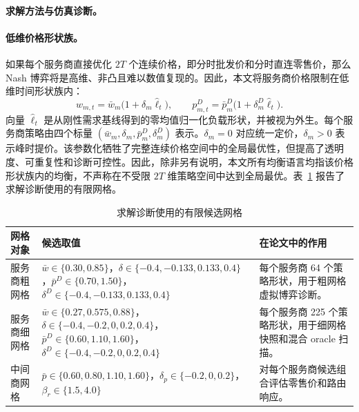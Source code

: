 \documentclass[UTF8,11pt,a4paper]{ctexart}
\begin{document}
\paragraph{求解方法与仿真诊断。}
\label{sec:solver}

\paragraph{低维价格形状族。}

如果每个服务商直接优化 $2T$ 个连续价格，即分时批发价和分时直连零售价，那么 Nash 博弈将是高维、非凸且难以数值复现的。因此，本文将服务商价格限制在低维时间形状族内：
\begin{equation}
  w_{m,t}=\bar w_m\big(1+\delta_m\widehat{\ell}_t\big),
  \qquad
  p^D_{m,t}=\bar p^D_m\big(1+\delta^D_m\widehat{\ell}_t\big).
  \label{eq:shape}
\end{equation}
向量 $\widehat{\ell}_t$ 是从刚性需求基线得到的零均值归一化负载形状，并被视为外生。每个服务商策略由四个标量 $(\bar w_m,\delta_m,\bar p^D_m,\delta^D_m)$ 表示。$\delta_m=0$ 对应统一定价，$\delta_m>0$ 表示峰时提价。该参数化牺牲了完整连续价格空间中的全局最优性，但提高了透明度、可重复性和诊断可控性。因此，除非另有说明，本文所有均衡语言均指该价格形状族内的均衡，不声称在不受限 $2T$ 维策略空间中达到全局最优。表~\ref{tab:solver_grids} 报告了求解诊断使用的有限网格。

\begin{table}[H]
\centering
\caption{求解诊断使用的有限候选网格}
\label{tab:solver_grids}
\small
\begin{tabular}{p{}p{}p{}}
\toprule
网格对象 & 候选取值 & 在论文中的作用 \\
\midrule
服务商粗网格 &
$\bar w\in\{0.30,0.85\}$，$\delta\in\{-0.4,-0.133,0.133,0.4\}$，$\bar p^D\in\{0.70,1.50\}$，$\delta^D\in\{-0.4,-0.133,0.133,0.4\}$ &
每个服务商 64 个策略形状，用于粗网格虚拟博弈诊断。 \\
服务商细网格 &
$\bar w\in\{0.27,0.575,0.88\}$，$\delta\in\{-0.4,-0.2,0,0.2,0.4\}$，$\bar p^D\in\{0.60,1.10,1.60\}$，$\delta^D\in\{-0.4,-0.2,0,0.2,0.4\}$ &
每个服务商 225 个策略形状，用于细网格快照和混合 oracle 扫描。 \\
中间商网格 &
$\bar p\in\{0.60,0.80,1.10,1.60\}$，$\delta_p\in\{-0.2,0,0.2\}$，$\beta_r\in\{1.5,4.0\}$ &
对每个服务商候选组合评估零售价和路由响应。 \\
\bottomrule
\end{tabular}
\end{table}
\end{document}
